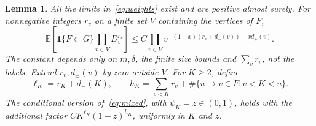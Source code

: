 \documentclass[11pt]{article}
\newtheorem{lemma}[theorem]{Lemma}
\theoremstyle{remark}\newtheorem{remark}[theorem]{Remark}
\newcommand{\E}{\mathbb E}
\newcommand{\ind}{\mathbf 1}
\begin{document}
\begin{lemma}\label{lem:mixed}
All the limits in~\eqref{eq:weights} exist and are positive almost surely.
For nonnegative integers $r_v$ on a finite set $V$ containing the vertices
of $F$,
\begin{equation}\label{eq:mixed}
 \E\left[\ind\{F\subset G\}\prod_{v\in V}D_v^{r_v}\right]
 \le C\prod_{v\in V}
 v^{-(1-x)(r_v+d_-(v))-x d_+(v)}.
\end{equation}
The constant depends only on $m,\delta$, the finite size bounds and
$\sum_v r_v$, not the labels. Extend $r_v,d_\pm(v)$ by zero outside $V$.
For $K\ge2$, define
\[
 \ell_K=r_K+d_-(K),\qquad
 h_K=\sum_{v<K}r_v+\#\{u\to v\in F:v<K<u\}.
\]
The conditional version of~\eqref{eq:mixed}, with $\psi_K=z\in(0,1)$,
holds with the additional factor $C K^{\ell_K}(1-z)^{h_K}$, uniformly in
$K$ and $z$.
\end{lemma}
\end{document}
